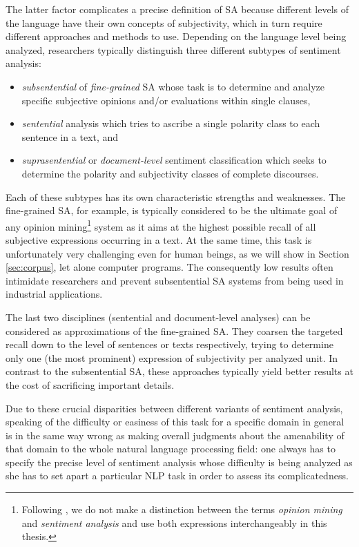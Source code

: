 The latter factor complicates a precise definition of SA because
different levels of the language have their own concepts of
subjectivity, which in turn require different approaches and methods
to use.  Depending on the language level being analyzed, researchers
typically distinguish three different subtypes of sentiment analysis:
\begin{itemize}
  \item\emph{subsentential} of \emph{fine-grained} SA whose task is to
    determine and analyze specific subjective opinions and/or
    evaluations within single clauses,
  \item\emph{sentential} analysis which tries to ascribe a single
    polarity class to each sentence in a text, and
  \item\emph{suprasentential} or \emph{document-level} sentiment
    classification which seeks to determine the polarity and
    subjectivity classes of complete discourses.
\end{itemize}

Each of these subtypes has its own characteristic strengths and
weaknesses.  The fine-grained SA, for example, is typically considered
to be the ultimate goal of any opinion mining\footnote{Following
  \citet{Liu:12}, we do not make a distinction between the terms
  \emph{opinion mining} and \emph{sentiment analysis} and use both
  expressions interchangeably in this thesis.}  system as it aims at
the highest possible recall of all subjective expressions occurring in
a text.  At the same time, this task is unfortunately very challenging
even for human beings, as we will show in Section \ref{sec:corpus},
let alone computer programs.  The consequently low results often
intimidate researchers and prevent subsentential SA systems from being
used in industrial applications.

The last two disciplines (sentential and document-level analyses) can
be considered as approximations of the fine-grained SA.  They coarsen
the targeted recall down to the level of sentences or texts
respectively, trying to determine only one (the most prominent)
expression of subjectivity per analyzed unit.  In contrast to the
subsentential SA, these approaches typically yield better results at
the cost of sacrificing important details.

Due to these crucial disparities between different variants of
sentiment analysis, speaking of the difficulty or easiness of this
task for a specific domain in general is in the same way wrong as
making overall judgments about the amenability of that domain to the
whole natural language processing field: one always has to specify the
precise level of sentiment analysis whose difficulty is being analyzed
as she has to set apart a particular NLP task in order to assess its
complicatedness.

